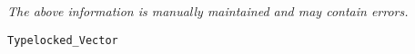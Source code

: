 \label{pkg:vector\_of\_one\_byte\_unts}

{\tiny \it The above information is manually maintained and may contain errors.}
\begin{verbatim}
Typelocked_Vector
\end{verbatim}

